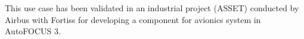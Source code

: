 This use case has been validated in an industrial project (ASSET) conducted by Airbus with Fortiss for developing a component for avionics system in AutoFOCUS 3. 









%
%
%

